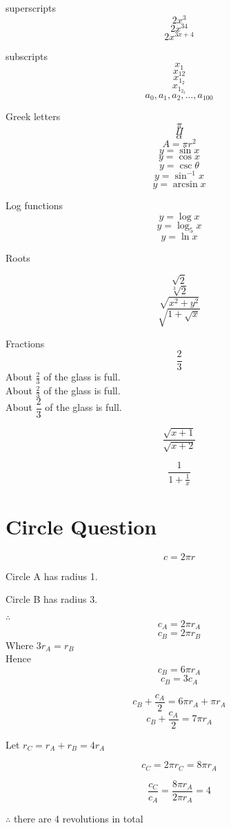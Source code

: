 \documentclass[11pt]{article}
\begin{document}
superscripts
$$2x^3$$
$$2x^{34}$$
$$2x^{3x+4}$$

subscripts
$$x_1$$
$$x_{12}$$
$$x_{1_2}$$
$$x_{1_{2_3}}$$
$$a_0, a_1, a_2, \ldots, a_{100}$$

Greek letters
$$\pi$$
$$\Pi$$
$$\alpha$$
$$A=\pi r^2$$
$$y=\sin x$$
$$y=\cos x$$
$$y=\csc \theta$$
$$y=\sin^{-1} x$$
$$y=\arcsin x$$

Log functions
$$y=\log x$$
$$y=\log_5 x$$
$$y=\ln x$$

Roots

$$\sqrt{2}$$
$$\sqrt[3]{2}$$
$$\sqrt{x^2+y^2}$$
$$\sqrt{ 1+\sqrt{x} }$$

Fractions
$$\frac{2}{3}$$
About $\displaystyle \frac{2}{3}$ of the glass is full.\\[16pt] %
About $\frac{2}{3}$ of the glass is full.\\[6pt] %
About $\dfrac{2}{3}$ of the glass is full. %

$$\frac{\sqrt{x+1}}{\sqrt{x+2}}$$

$$\frac{1}{1 + \frac{1}{x}}$$

\section{Circle Question}

$$c = 2 \pi r$$

Circle A has radius 1.

Circle B has radius 3.

$\therefore$
$$c_A = 2 \pi r_A$$
$$c_B = 2 \pi r_B$$
Where $3r_A = r_B$\\
Hence 
$$c_B = 6 \pi r_A$$
$$c_B = 3 c_A$$

$$c_B + \frac{c_A}{2} = 6 \pi r_A + \pi r_A$$
$$c_B + \frac{c_A}{2} = 7 \pi r_A $$

Let $r_C = r_A + r_B = 4 r_A$

$$c_C = 2 \pi r_C = 8 \pi r_A$$

$$\frac{c_C}{c_A} = \frac{8 \pi r_A}{2 \pi r_A} = 4$$

$\therefore$ there are 4 revolutions in total
\end{document}
